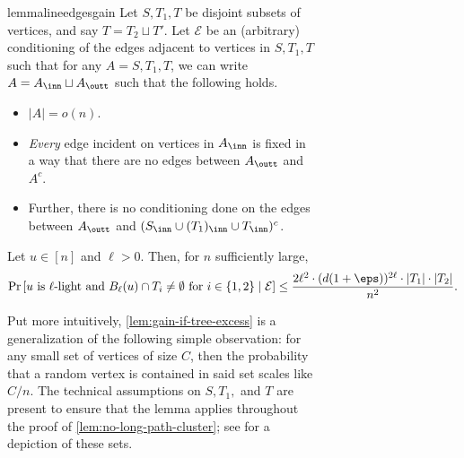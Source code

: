 \documentclass[11pt,letterpaper]{article}
\begin{document}
\begin{figure}
\begin{figure}
    \begin{restatable}{lemma}{lineedgesgain}
        \label{lem:gain-if-tree-excess}
        Let $S,T_1,T$ be disjoint subsets of vertices, and say $T = T_2 \sqcup T'$. Let $\mathcal{E}$ be an (arbitrary) conditioning of the edges adjacent to vertices in $S,T_1,T$ such that for any $A = S,T_1,T$, we can write $A = A_{\inn} \sqcup A_{\outt}$ such that the following holds.
        \begin{itemize}
            \item $|A| = o(n)$.
            \item \emph{Every} edge incident on vertices in $A_{\inn}$ is fixed in a way that there are no edges between $A_{\outt}$ and $A^c$.
            \item Further, there is no conditioning done on the edges between $A_{\outt}$ and $(S_{\inn} \cup (T_1)_{\inn} \cup T_{\inn})^c$.
        \end{itemize}
        Let $u \in [n]$ and $\ell > 0$. Then, for $n$ sufficiently large,
        \[ \Pr\left[ \text{$u$ is $\ell$-light and } B_{\ell}(u) \cap T_i \ne \emptyset \text{ for } i \in \{1, 2\} \mid \mathcal{E} \right] \le \frac{2\ell^2 \cdot (d(1+\eps))^{2\ell} \cdot |T_1| \cdot |T_2|}{n^2}. \]
    \end{restatable}
    \begin{remark}
    Put more intuitively, \cref{lem:gain-if-tree-excess} is a generalization of the following simple observation: for any small set of vertices of size $C$, then the probability that a random vertex is contained in said set scales like $C/n$. 
    The technical assumptions on $S, T_1,$ and $T$ are present to ensure that the lemma applies throughout the proof of \cref{lem:no-long-path-cluster}; see  for a depiction of these sets.
    \end{remark}

    \begin{figure}[ht]
        \centering
        \begin{tikzpicture}[
            ball/.style={circle, draw=black, fill=white, minimum size=20mm, align=center},
            special ball/.style={circle, draw=blue, dashed, fill=blue!5, opacity=0.5, pattern=north east lines, pattern color=blue!40, minimum size=20mm},
            t2/.style={circle, draw=green, fill=green!20,minimum size=20mm},
            clip ball/.style={circle, draw=black, fill=white, minimum size=20mm, postaction={fill=blue!20, even odd rule, clip}},
            t1/.style={circle, draw=purple, fill=purple!20,minimum size=20mm},
            next ball/.style={circle, draw=red, fill=red!10, minimum size=20mm}]
    

\end{tikzpicture}
\end{figure}
\end{figure}
\end{figure}
\end{document}
